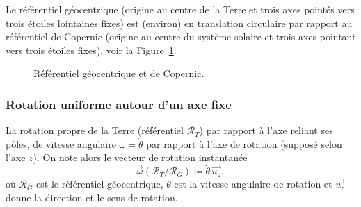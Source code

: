             \begin{example}
                Le référentiel géocentrique (origine au centre de la Terre et trois axes pointés vers trois étoiles lointaines \og fixes\fg) est (environ) en translation circulaire par rapport au référentiel de Copernic (origine au centre du système solaire et trois axes pointant vers trois étoiles \og fixes\fg), voir la Figure~\ref{fig:refentiel_geocentrique_copernic}.
                \begin{figure}[!h]
                    \centering
                    \caption{Référentiel géocentrique et de Copernic.}    
                    \label{fig:refentiel_geocentrique_copernic}
                \end{figure}
            \end{example}

        \subsubsection{Rotation uniforme autour d'un axe fixe}
            
            \begin{example}
                La rotation propre de la Terre (référentiel $\mathcal{R}_{T}$) par rapport à l'axe reliant ses pôles, de vitesse angulaire $\omega=\dot{\theta}$ par rapport à l'axe de rotation (supposé selon l'axe $z$). On note alors le vecteur de rotation instantanée
                \begin{equation}
                    \vec{\omega}(\mathcal{R}_{T}/\mathcal{R}_{G})\coloneqq \dot{\theta}\,\vec{u_z},
                \end{equation}
                où $\mathcal{R}_{G}$ est le référentiel géocentrique, $\dot{\theta}$ est la vitesse angulaire de rotation et $\vec{u_z}$ donne la direction et le sens de rotation.
            \end{example}


